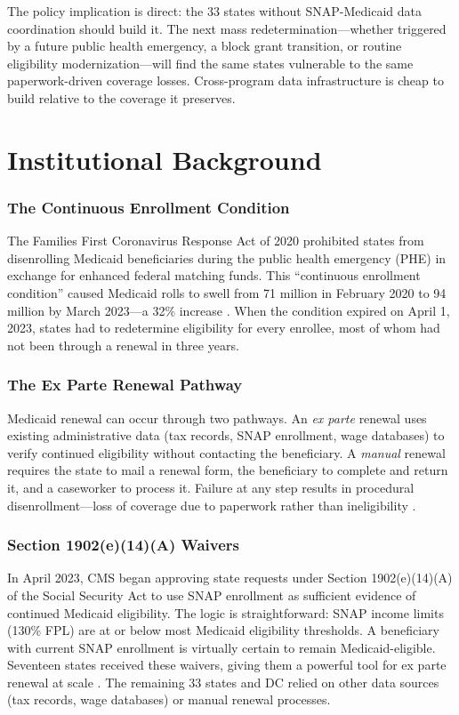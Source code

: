 \documentclass[12pt]{article}
\begin{document}
The policy implication is direct: the 33 states without SNAP-Medicaid data coordination should build it. The next mass redetermination---whether triggered by a future public health emergency, a block grant transition, or routine eligibility modernization---will find the same states vulnerable to the same paperwork-driven coverage losses. Cross-program data infrastructure is cheap to build relative to the coverage it preserves.

\section{Institutional Background}

\subsubsection*{The Continuous Enrollment Condition} The Families First Coronavirus Response Act of 2020 prohibited states from disenrolling Medicaid beneficiaries during the public health emergency (PHE) in exchange for enhanced federal matching funds. This ``continuous enrollment condition'' caused Medicaid rolls to swell from 71 million in February 2020 to 94 million by March 2023---a 32\% increase \citep{gordon2023medicaid}. When the condition expired on April 1, 2023, states had to redetermine eligibility for every enrollee, most of whom had not been through a renewal in three years.

\subsubsection*{The Ex Parte Renewal Pathway} Medicaid renewal can occur through two pathways. An \emph{ex parte} renewal uses existing administrative data (tax records, SNAP enrollment, wage databases) to verify continued eligibility without contacting the beneficiary. A \emph{manual} renewal requires the state to mail a renewal form, the beneficiary to complete and return it, and a caseworker to process it. Failure at any step results in procedural disenrollment---loss of coverage due to paperwork rather than ineligibility \citep{sugar2021medicaid}.

\subsubsection*{Section 1902(e)(14)(A) Waivers} In April 2023, CMS began approving state requests under Section 1902(e)(14)(A) of the Social Security Act to use SNAP enrollment as sufficient evidence of continued Medicaid eligibility. The logic is straightforward: SNAP income limits (130\% FPL) are at or below most Medicaid eligibility thresholds. A beneficiary with current SNAP enrollment is virtually certain to remain Medicaid-eligible. Seventeen states received these waivers, giving them a powerful tool for ex parte renewal at scale \citep{cbpp2024renewals}. The remaining 33 states and DC relied on other data sources (tax records, wage databases) or manual renewal processes.
\end{document}
